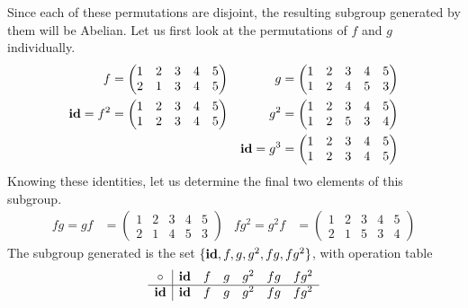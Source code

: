 \documentclass{article}
\begin{document}
Since each of these permutations are disjoint, the resulting subgroup generated by them will be Abelian. Let us first look at the permutations of $f$ and $g$ individually.
\begin{align*}
    f & = \begin{pmatrix} 
        1 & 2 & 3 & 4 & 5 \\
        2 & 1 & 3 & 4 & 5 
    \end{pmatrix} &
    g & = \begin{pmatrix} 
        1 & 2 & 3 & 4 & 5 \\
        1 & 2 & 4 & 5 & 3
    \end{pmatrix} \\
    \operatorname{\textbf{id}} = f^2 & = \begin{pmatrix}
        1 & 2 & 3 & 4 & 5 \\
        1 & 2 & 3 & 4 & 5
    \end{pmatrix} &
    g^2 & = \begin{pmatrix}
        1 & 2 & 3 & 4 & 5 \\
        1 & 2 & 5 & 3 & 4
    \end{pmatrix} \\
    && \operatorname{\textbf{id}} = g^3 & = \begin{pmatrix}
        1 & 2 & 3 & 4 & 5 \\
        1 & 2 & 3 & 4 & 5
    \end{pmatrix}
\end{align*}
Knowing these identities, let us determine the final two elements of this subgroup.
\begin{align*}
    fg = gf & = \begin{pmatrix}
        1 & 2 & 3 & 4 & 5 \\
        2 & 1 & 4 & 5 & 3
    \end{pmatrix} &
    fg^2 = g^2f & = \begin{pmatrix}
        1 & 2 & 3 & 4 & 5 \\
        2 & 1 & 5 & 3 & 4
    \end{pmatrix}
\end{align*}
The subgroup generated is the set $\{\operatorname{\textbf{id}},f,g,g^2,fg,fg^2\}$, with operation table
\[
    \begin{array}{c|cccccc}
    \circ & \operatorname{\textbf{id}} & f & g & g^2 & fg & fg^2 \\
    \hline
    \operatorname{\textbf{id}} & \operatorname{\textbf{id}} & f & g & g^2 & fg & fg^2
    \end{array}
\]
\end{document}
